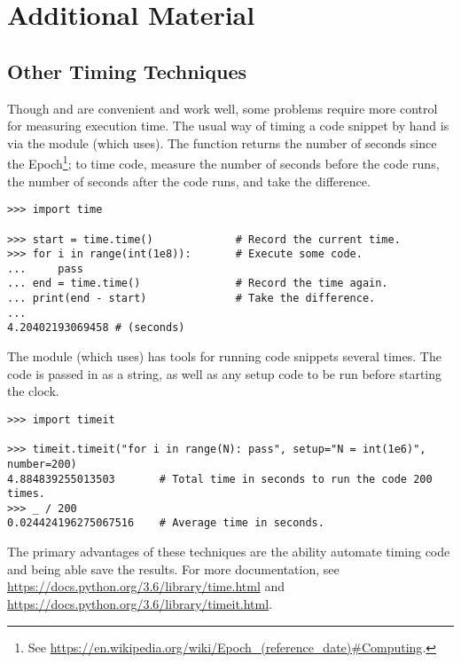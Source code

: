 \newpage

\section*{Additional Material} %

\subsection*{Other Timing Techniques} %

Though  and  are convenient and work well, some problems require more control for measuring execution time.
The usual way of timing a code snippet by hand is via the  module (which  uses).
The function  returns the number of seconds since the Epoch\footnote{See \url{https://en.wikipedia.org/wiki/Epoch_(reference_date)\#Computing}.}; to time code, measure the number of seconds before the code runs, the number of seconds after the code runs, and take the difference.

\begin{lstlisting}
>>> import time

>>> start = time.time()             # Record the current time.
>>> for i in range(int(1e8)):       # Execute some code.
...     pass
... end = time.time()               # Record the time again.
... print(end - start)              # Take the difference.
...
4.20402193069458 # (seconds)
\end{lstlisting}

The  module (which  uses) has tools for running code snippets several times.
The code is passed in as a string, as well as any setup code to be run before starting the clock.

\begin{lstlisting}
>>> import timeit

>>> timeit.timeit("for i in range(N): pass", setup="N = int(1e6)", number=200)
4.884839255013503       # Total time in seconds to run the code 200 times.
>>> _ / 200
0.024424196275067516    # Average time in seconds.
\end{lstlisting}

The primary advantages of these techniques are the ability automate timing code and being able save the results.
For more documentation, see \url{https://docs.python.org/3.6/library/time.html} and \url{https://docs.python.org/3.6/library/timeit.html}.

